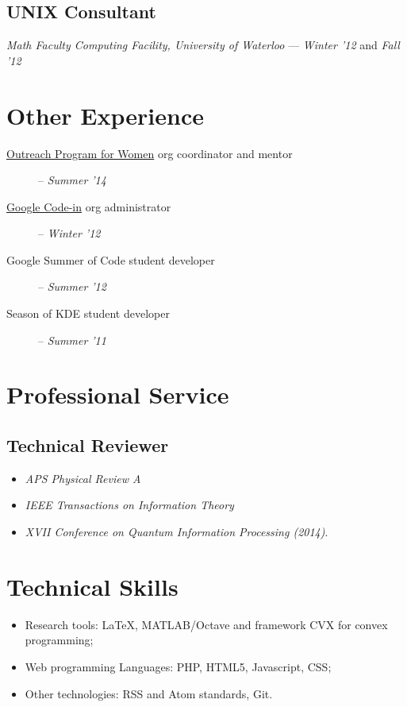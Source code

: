 \documentclass[]{article}
\begin{document}
\subsection{UNIX Consultant}
\emph{Math Faculty Computing Facility, University of Waterloo} ---
\emph{Winter '12} and \emph{Fall '12}


\section{Other Experience}\label{work-experience}

\begin{description}
\item[\href{https://gnome.org/opw/}{Outreach Program for Women}
org coordinator and mentor] -- \emph{Summer '14}
\item[\href{https://www.google-melange.com/gci/homepage/google/gci2012}{Google
Code-in} org administrator] -- \emph{Winter '12}
\item[Google Summer of Code student developer] -- \emph{Summer '12}
\item[Season of KDE student developer]  -- \emph{Summer '11}
\end{description}

\section{Professional Service}\label{professional-service}

\subsection{Technical Reviewer} 
\begin{itemize}
  \item \emph{APS Physical Review A}
  \item \emph{IEEE Transactions on Information Theory}
  \item \emph{XVII Conference on Quantum Information Processing (2014)}.
\end{itemize}

\section{Technical Skills}\label{technical-skills}

\begin{itemize}
\itemsep1pt\parskip0pt
\item
  Research tools: LaTeX, MATLAB/Octave and framework CVX for convex
  programming;
\item
  Web programming Languages: PHP, HTML5, Javascript, CSS;
\item
  Other technologies: RSS and Atom standards, Git.
\end{itemize}
\end{document}
